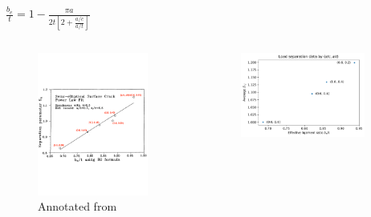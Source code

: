 \begin{frame}
\begin{center}\(
\frac{b_e}{t} = 1 - \frac{\pi a}{2t \left[ 2 + \frac{a/c}{a/t} \right]}
\)\end{center}
\begin{columns}[t]
\begin{column}{0.45\textwidth}
\begin{figure}[tbp]
\centering
\includegraphics[width=0.9\textwidth]{load-sep-tension-sl-2}
\caption{\label{fig:load-sep-tension-sl} Annotated from \cite{sharobeamlandes1993}}
\end{figure}
\end{column}
\begin{column}{0.45\textwidth}
\begin{figure}[tbp]
\centering
\includegraphics[width=0.9\textwidth]{bet_Sij_tension}

\end{figure}
\end{column}
\end{columns}
\end{frame}
